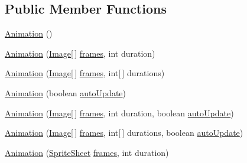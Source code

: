 \subsection*{Public Member Functions}
\begin{DoxyCompactItemize}
\item 
\mbox{\hyperlink{classorg_1_1newdawn_1_1slick_1_1_animation_a1fe2a5ff67cb544ae398375729b5559c}{Animation}} ()
\item 
\mbox{\hyperlink{classorg_1_1newdawn_1_1slick_1_1_animation_a4ad4c409fb2092a338732517a8c303a8}{Animation}} (\mbox{\hyperlink{classorg_1_1newdawn_1_1slick_1_1_image}{Image}}\mbox{[}$\,$\mbox{]} \mbox{\hyperlink{classorg_1_1newdawn_1_1slick_1_1_animation_a39f0c6a16e479985b22f7dd3bb781bf7}{frames}}, int duration)
\item 
\mbox{\hyperlink{classorg_1_1newdawn_1_1slick_1_1_animation_a91f5bff0ba683a4c9d319c4fc471dcf8}{Animation}} (\mbox{\hyperlink{classorg_1_1newdawn_1_1slick_1_1_image}{Image}}\mbox{[}$\,$\mbox{]} \mbox{\hyperlink{classorg_1_1newdawn_1_1slick_1_1_animation_a39f0c6a16e479985b22f7dd3bb781bf7}{frames}}, int\mbox{[}$\,$\mbox{]} durations)
\item 
\mbox{\hyperlink{classorg_1_1newdawn_1_1slick_1_1_animation_a321d51203eb9e4fc1fbbcacd0eafb79b}{Animation}} (boolean \mbox{\hyperlink{classorg_1_1newdawn_1_1slick_1_1_animation_a343dbff14a050cf8753e9a67746deede}{auto\+Update}})
\item 
\mbox{\hyperlink{classorg_1_1newdawn_1_1slick_1_1_animation_a63906cb218e07821618b28ba434690d2}{Animation}} (\mbox{\hyperlink{classorg_1_1newdawn_1_1slick_1_1_image}{Image}}\mbox{[}$\,$\mbox{]} \mbox{\hyperlink{classorg_1_1newdawn_1_1slick_1_1_animation_a39f0c6a16e479985b22f7dd3bb781bf7}{frames}}, int duration, boolean \mbox{\hyperlink{classorg_1_1newdawn_1_1slick_1_1_animation_a343dbff14a050cf8753e9a67746deede}{auto\+Update}})
\item 
\mbox{\hyperlink{classorg_1_1newdawn_1_1slick_1_1_animation_aae45b74d213cab364dd435dc76375664}{Animation}} (\mbox{\hyperlink{classorg_1_1newdawn_1_1slick_1_1_image}{Image}}\mbox{[}$\,$\mbox{]} \mbox{\hyperlink{classorg_1_1newdawn_1_1slick_1_1_animation_a39f0c6a16e479985b22f7dd3bb781bf7}{frames}}, int\mbox{[}$\,$\mbox{]} durations, boolean \mbox{\hyperlink{classorg_1_1newdawn_1_1slick_1_1_animation_a343dbff14a050cf8753e9a67746deede}{auto\+Update}})
\item 
\mbox{\hyperlink{classorg_1_1newdawn_1_1slick_1_1_animation_aba0f8fc397de26db3474c4f4c4ef185a}{Animation}} (\mbox{\hyperlink{classorg_1_1newdawn_1_1slick_1_1_sprite_sheet}{Sprite\+Sheet}} \mbox{\hyperlink{classorg_1_1newdawn_1_1slick_1_1_animation_a39f0c6a16e479985b22f7dd3bb781bf7}{frames}}, int duration)

\end{DoxyCompactItemize}
